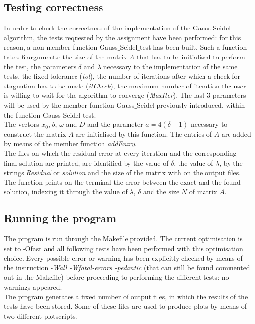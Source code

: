 \documentclass[11pt]{article}
\theoremstyle{theorem}
\theoremstyle{definition}
\begin{document}
\subsection{Testing correctness}
In order to check the correctness of the implementation of the Gauss-Seidel algorithm, the tests requested by the assignment have been performed: for this reason, a non-member function Gauss$\_$Seidel$\_$test has been built. Such a function takes 6 arguments: the size of the matrix $A$ that has to be initialised to perform the test, the parameters $\delta$ and $\lambda$ necessary to the implementation of the same tests, the fixed tolerance (\emph{tol}), the number of iterations after which a check for stagnation has to be made (\emph{itCheck}), the maximum number of iteration the user is willing to wait for the algorithm to converge (\emph{MaxIter}). The last 3 parameters will be used by the member function Gauss$\_$Seidel previously introduced, within the function Gauss$\_$Seidel$\_$test.\\
The vectors $x_0$, $b$, $\omega$ and $D$ and the parameter $a=4(\delta-1)$ necessary to construct the matrix $A$ are initialised by this function. The entries of $A$ are added by means of the member function \emph{addEntry}.\\
The files on which the residual error at every iteration and the corresponding final solution are printed, are identified by the value of $\delta$, the value of $\lambda$, by the strings \emph{Residual} or \emph{solution} and the size of the matrix with on the output files.\\
The function prints on the terminal the error between the exact and the found solution, indexing it through the value of $\lambda$, $\delta$ and the size $N$ of matrix $A$.\\

\subsection{Running the program}
The program is run through the Makefile provided. The current optimisation is set to -Ofast and all following tests have been performed with this optimisation choice. Every possible error or warning has been explicitly checked by means of the instruction \emph{-Wall -Wfatal-errors -pedantic} (that can still be found commented out in the Makefile) before proceeding to performing the different tests: no warnings appeared.\\
The program generates a fixed number of output files, in which the results of the tests have been stored. Some of these files are used to produce plots by means of two different plotscripts.\\
\end{document}
